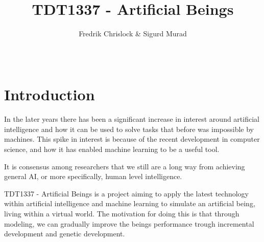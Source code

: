 \documentclass{article}
\title{\textbf{TDT1337 - Artificial Beings}}
\author{Fredrik Chrislock \& Sigurd Murad}
\date{~}
\begin{document}
	\maketitle
	\section{Introduction}
	In the later years there has been a significant increase in interest around artificial intelligence and how it can be used to solve tasks that before was impossible by machines. This spike in interest is because of the recent development in computer science, and how it has enabled machine learning to be a useful tool. 
	
	It is consensus among researchers that we still are a long way from achieving general AI, or more specifically, human level intelligence. 
	
	TDT1337 - Artificial Beings is a project aiming to apply the latest technology within artificial intelligence and machine learning to simulate an artificial being, living within a virtual world. The motivation for doing this is that through modeling, we can gradually improve the beings performance trough incremental development and genetic development.
	
\end{document}
